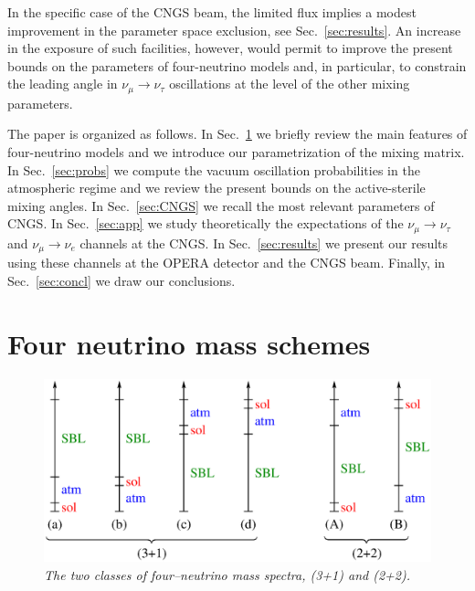 \documentclass[12pt]{elsart}
\begin{document}
In the specific case of the CNGS beam, the limited flux implies a
modest improvement in the parameter space exclusion, see
Sec.~\ref{sec:results}.  An increase in the exposure of such
facilities, however, would permit to improve the present bounds on the
parameters of four-neutrino models and, in particular, to constrain
the leading angle in $\nu_\mu \to \nu_\tau$ oscillations at the level
of the other mixing parameters. 

The paper is organized as follows. In Sec.~\ref{sec:schemes} we
briefly review the main features of four-neutrino models and we
introduce our parametrization of the mixing matrix. In
Sec.~\ref{sec:probs} we compute the vacuum oscillation probabilities
in the atmospheric regime and we review the present bounds on the
active-sterile mixing angles. In Sec.~\ref{sec:CNGS} we recall the
most relevant parameters of CNGS. In Sec.~\ref{sec:app} we study
theoretically the expectations of the $\nu_\mu \to \nu_\tau$ and
$\nu_\mu \to \nu_e$ channels at the CNGS. In Sec.~\ref{sec:results} we
present our results using these channels at the OPERA detector and the
CNGS beam. Finally, in Sec.~\ref{sec:concl} we draw our conclusions.

\section{Four neutrino mass schemes}
\label{sec:schemes}

\begin{figure}[t] \centering
    \includegraphics[width=0.7\linewidth]{fig.schemes.eps}
    \caption{\label{fig:schemes}\sl%
      The two classes of four--neutrino mass spectra, (3+1) and
      (2+2).}
\end{figure}
\end{document}

